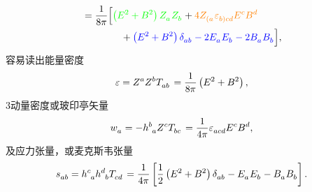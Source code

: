 \begin{xiti}
\begin{zm}
\begin{tcolorbox}[breakable,title=补充,fonttitle=\normalfont\bfseries]
\begin{equation*}
\begin{split}
						&= \frac{1}{8\pi} \Big[ {\color{green} \left( E^2 + B^2 \right) \tensor{Z}{_a} \tensor{Z}{_b}} + {\color{orange} 4 \tensor{Z}{_{(a}} \tensor{\varepsilon}{_{b)}_c_d} \tensor{E}{^c} \tensor{B}{^d}} \\
						&\qquad\qquad {}+ {\color{blue} \left( E^2 + B^2 \right) \tensor{\delta}{_a_b} - 2 \tensor{E}{_a} \tensor{E}{_b} - 2 \tensor{B}{_a} \tensor{B}{_b}} \Big],
					\end{split}
				\end{equation*}
				容易读出能量密度
				\begin{equation*}
					\varepsilon = \tensor{Z}{^a} \tensor{Z}{^b} \tensor{T}{_a_b} = \frac{1}{8\pi} \left( E^2 + B^2 \right),
				\end{equation*}
				3动量密度或玻印亭矢量
				\begin{equation*}
					\tensor{w}{_a} = - \tensor{h}{^b_a} \tensor{Z}{^c} \tensor{T}{_b_c} = \frac{1}{4\pi} \tensor{\varepsilon}{_a_c_d} \tensor{E}{^c} \tensor{B}{^d},
				\end{equation*}
				及应力张量，或麦克斯韦张量
				\begin{equation*}
					\tensor{s}{_a_b} = \tensor{h}{^c_a} \tensor{h}{^d_b} \tensor{T}{_c_d} = \frac{1}{4\pi} \left[ \frac{1}{2} \left( E^2 + B^2 \right) \tensor{\delta}{_a_b} - \tensor{E}{_a} \tensor{E}{_b} - \tensor{B}{_a} \tensor{B}{_b} \right].
				\end{equation*}
			\end{tcolorbox}
		\end{zm}
	
\end{xiti}